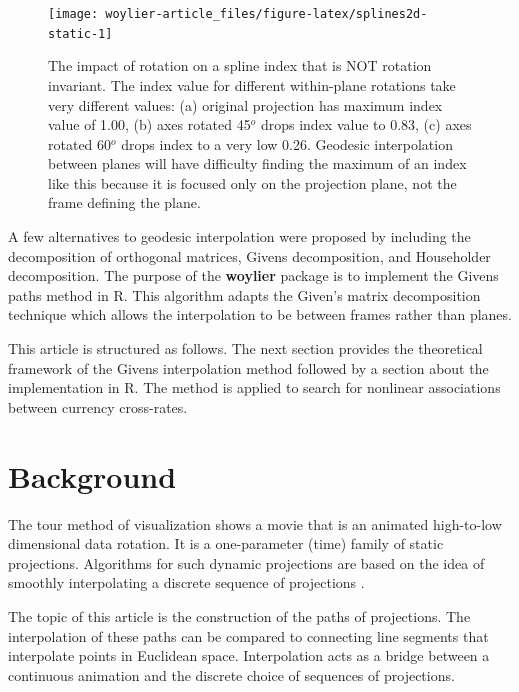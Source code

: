 \begin{Schunk}
\begin{figure}
\texttt{[image: woylier-article\_files/figure-latex/splines2d-static-1]} \caption[The impact of rotation on a spline index that is NOT rotation invariant]{The impact of rotation on a spline index that is NOT rotation invariant. The index value for different within-plane rotations take very different values: (a) original projection has maximum index value of 1.00, (b) axes rotated 45$^o$ drops index value to 0.83, (c) axes rotated 60$^o$ drops index to a very low 0.26. Geodesic interpolation between planes will have difficulty finding the maximum of an index like this because it is focused only on the projection plane, not the frame defining the plane.}\label{fig:splines2d-static}
\end{figure}
\end{Schunk}

A few alternatives to geodesic interpolation were proposed by
\citet{buja_cook_asimov_hurley_2005} including the decomposition of
orthogonal matrices, Givens decomposition, and Householder
decomposition. The purpose of the \textbf{woylier} package is to
implement the Givens paths method in R. This algorithm adapts the
Given's matrix decomposition technique which allows the interpolation to
be between frames rather than planes.

This article is structured as follows. The next section provides the
theoretical framework of the Givens interpolation method followed by a
section about the implementation in R. The method is applied to search
for nonlinear associations between currency cross-rates.

\hypertarget{background}{%
\section{Background}\label{background}}

The tour method of visualization shows a movie that is an animated
high-to-low dimensional data rotation. It is a one-parameter (time)
family of static projections. Algorithms for such dynamic projections
are based on the idea of smoothly interpolating a discrete sequence of
projections \citep{buja_cook_asimov_hurley_2005}.

The topic of this article is the construction of the paths of
projections. The interpolation of these paths can be compared to
connecting line segments that interpolate points in Euclidean space.
Interpolation acts as a bridge between a continuous animation and the
discrete choice of sequences of projections.

